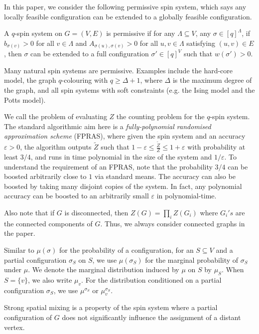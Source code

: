 \documentclass{theoretics}
\newcommand{\eps}{\varepsilon}
\begin{document}
In this paper, we consider the following permissive spin system, which says any locally feasible configuration can be extended to a globally feasible configuration.
\begin{definition}
  A $q$-spin system on $G=(V,E)$ is permissive if for any $\Lambda \subseteq V$, any $\sigma \in [q]^\Lambda$, if $b_{\sigma(v)} > 0$ for all $v \in \Lambda$ and $A_{\sigma(u),\sigma(v)} > 0$ for all $u,v \in \Lambda$ satisfying $(u,v) \in E$, then $\sigma$ can be extended to a full configuration $\sigma' \in [q]^V$ such that $w(\sigma')>0$.
\end{definition}
Many natural spin systems are permissive. Examples include the hard-core model, the graph $q$-colouring with $q \geq \Delta + 1$, where $\Delta$ is the maximum degree of the graph, and all spin systems with soft constraints (e.g. the Ising model and the Potts model).

We call the problem of evaluating $Z$ the counting problem for the $q$-spin system.
The standard algorithmic aim here is a \emph{fully-polynomial randomised approximation scheme} (FPRAS),
where given the spin system and an accuracy $\eps>0$,
the algorithm outputs $\widetilde{Z}$ such that $1-\eps\le\frac{\widetilde{Z}}{Z}\le 1+\eps$ with probability at least $3/4$, and runs in time polynomial in the size of the system and $1/\eps$.
To understand the requirement of an FPRAS, note that the probability $3/4$ can be boosted arbitrarily close to $1$ via standard means.
The accuracy can also be boosted by taking many disjoint copies of the system.
In fact, any polynomial accuracy can be boosted to an arbitrarily small $\eps$ in polynomial-time.

Also note that if $G$ is disconnected, then $Z(G)=\prod_{i}Z(G_i)$ where $G_i's$ are the connected components of $G$.
Thus, we always consider connected graphs in the paper.

Similar to $\mu(\sigma)$ for the probability of a configuration, for an $S\subseteq V$ and a partial configuration $\sigma_S$ on $S$, we use $\mu(\sigma_S)$ for the marginal probability of $\sigma_S$ under $\mu$.
We denote the marginal distribution induced by $\mu$ on $S$ by $\mu_S$.
When $S=\{v\}$, we also write $\mu_v$. For the distribution conditioned on a partial configuration $\sigma_S$, we use $\mu^{\sigma_S}$ or $\mu_v^{\sigma_S}$. 

Strong spatial mixing is a property of the spin system where a partial configuration of $G$ does not significantly influence the assignment of a distant vertex. 
\end{document}
